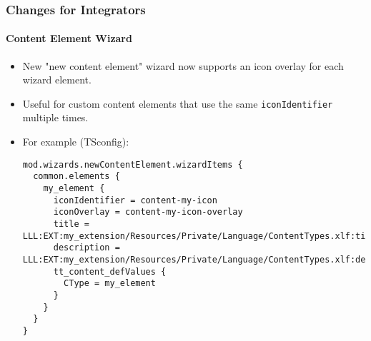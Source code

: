 %

\begin{frame}[fragile]
	\frametitle{Changes for Integrators}
	\framesubtitle{Content Element Wizard}


	\begin{itemize}
		\item New "new content element" wizard now supports an icon overlay for
			each wizard element.
		\item Useful for custom content elements that use the same
			\texttt{iconIdentifier} multiple times.
		\item For example (TSconfig):
\begin{lstlisting}
mod.wizards.newContentElement.wizardItems {
  common.elements {
    my_element {
      iconIdentifier = content-my-icon
      iconOverlay = content-my-icon-overlay
      title = LLL:EXT:my_extension/Resources/Private/Language/ContentTypes.xlf:title
      description = LLL:EXT:my_extension/Resources/Private/Language/ContentTypes.xlf:description
      tt_content_defValues {
        CType = my_element
      }
    }
  }
}
\end{lstlisting}

	\end{itemize}

\end{frame}

